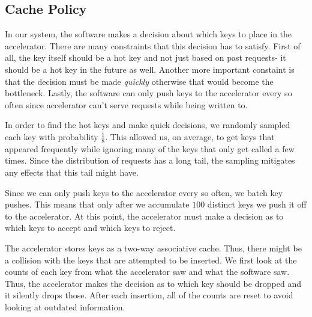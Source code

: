 \subsection{Cache Policy}

In our system, the software makes a decision about which keys to place in the
accelerator. There are many constraints that this decision has to satisfy.
First of all, the key itself should be a hot key and not just based on past
requests- it should be a hot key in the future as well. Another more important
constaint is that the decision must be made \emph{quickly} otherwise that would
become the bottleneck. Lastly, the software can only push keys to the
accelerator every so often since accelerator can't serve requests while being
written to.

In order to find the hot keys and make quick decisions, we randomly sampled
each key with probability $\frac{1}{8}$. This allowed us, on average, to get
keys that appeared frequently while ignoring many of the keys that only get
called a few times. Since the distribution of requests has a long tail, the
sampling mitigates any effects that this tail might have.

Since we can only push keys to the accelerator every so often, we batch key
pushes. This means that only after we accumulate $100$ distinct keys we push it
off to the accelerator. At this point, the accelerator must make a decision as
to which keys to accept and which keys to reject.

The accelerator stores keys as a two-way associative cache. Thus, there might
be a collision with the keys that are attempted to be inserted. We first look
at the counts of each key from what the accelerator saw and what the software
saw. Thus, the accelerator makes the decision as to which key should be dropped
and it silently drops those. After each insertion, all of the counts are reset
to avoid looking at outdated information.
